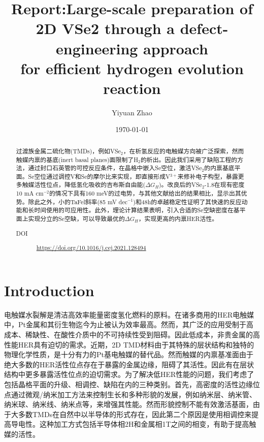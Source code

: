 \documentclass[reprint, aps, prb, showkeys]{revtex4-2}
\begin{document}
\title{Report:Large-scale preparation of 2D VSe2 through a defect-engineering approach \\
for efficient hydrogen evolution reaction}

\author{Yiyuan Zhao}
\date{\today}

\begin{abstract}
过渡族金属二硫化物(TMDs)，例如VSe$_2$，在析氢反应的电触媒方向被广泛探索，然而触媒内禀的基底(inert basal planes)面限制了H$_2$的析出。因此我们采用了缺陷工程的方法，通过封口石英管的可控反应条件，在晶格中嵌入Se空位，激活VSe$_2$的内禀基底平面。Se空位通过调控V和Se的摩尔比来实现，即直接形成V$^{3+}$来修补电子构型，暴露更多触媒活性位点，降低氢化吸收的吉布斯自由能($\Delta G_H$)。改良后的VSe$_2$-1.8在现有密度10 mA cm$^{-2}$的情况下具有160 meV的过电势，与其他文献给出的结果相比，显示出其优势。除此之外，小的TaFel斜率(85 mV dec$^{-1}$)和48h的卓越稳定性证明了其快速的反应动能和长时间使用的可应用性。此外，理论计算结果表明，引入合适的Se空缺密度在基平面上实现分立的Se空缺，可以导致最优的$\Delta G_H$，实现更高的内禀HER活性。
\begin{description}
    \item[DOI] \url{https://doi.org/10.1016/j.cej.2021.128494}
\end{description}
\end{abstract}


\maketitle

\section{Introduction}
电触媒水裂解是清洁高效率能量密度氢化燃料的原料。在诸多商用的HER电触媒中，Pt金属和其衍生物迄今为止被认为效率最高。然而，其广泛的应用受制于高成本、稀缺性、在酸性介质中的不可持续性受到阻碍。因此低成本，非贵金属的高性能HER具有迫切的需求。近期，2D TMD材料由于其特殊的层状结构和独特的物理化学性质，是十分有力的Pt基电触媒的替代品。然而触媒的内禀基准面由于绝大多数的HER活性位点存在于暴露的金属边缘，阻碍了其活性。因此有在层状结构中更多暴露活性位点的迫切需求。为了解决低HER性能的问题，我们考虑了包括晶格平面的升级、相调控、缺陷在内的三种类别。首先，高密度的活性边缘位点通过微观/纳米加工方法来控制生长和多种形貌的发展，例如纳米层、纳米管、纳米球、纳米线、纳米点等，来增强其性能。然而形貌控制不能有效激活基面，由于大多数TMDs在自然中以半导体的形式存在，因此第二个原因是使用相调控来提高导电性。这种加工方式包括半导体相2H和金属相1T之间的相变，有助于提高触媒的活性。
\end{document}
